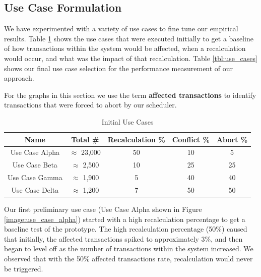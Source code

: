 \subsection{Use Case Formulation}

We have experimented with a variety of use cases to fine tune our empirical results.  Table \ref{tbl:use_cases_initial} shows the use cases that were executed initially to get a baseline of how transactions within the system would be affected, when a recalculation would occur, and what was the impact of that recalculation. Table \ref{tbl:use_cases} shows our final use case selection for the performance measurement of our approach.

For the graphs in this section we use the term \textbf{affected transactions} to identify transactions that were forced to abort by our scheduler.



\begin{table}
\caption{Initial Use Cases}
\captionsetup{justification=centering}
\centering
 \begin{tabular}{|| c | c | c | c | c ||} 
 \hline
 \textbf{Name} & \textbf{Total \#} & \textbf{Recalculation \%} &  \textbf{Conflict \%} & \textbf{Abort \%} \\ [0.5ex] 
 \hline\hline
 Use Case Alpha & $\approx$ 23,000 & 50 & 10 & 5  \\ 
 \hline
 Use Case Beta & $\approx$ 2,500 & 10 & 25 & 25  \\ 
 \hline
 Use Case Gamma & $\approx$ 1,900 & 5 & 40 & 40  \\ 
 \hline
 Use Case Delta & $\approx$ 1,200 & 7 & 50 & 50  \\ 
 [1ex] 
 \hline
\end{tabular}
\label{tbl:use_cases_initial} %
\end{table}

Our first preliminary use case (Use Case Alpha shown in Figure \ref{image:use_case_alpha}) started with a high recalculation percentage to get a baseline test of the prototype. The high recalculation percentage (50\%) caused that initially, the affected transactions spiked to approximately 3\%, and then began to level off as the number of transactions within the system increased. We observed that with the 50\% affected transactions rate, recalculation would never be triggered.

